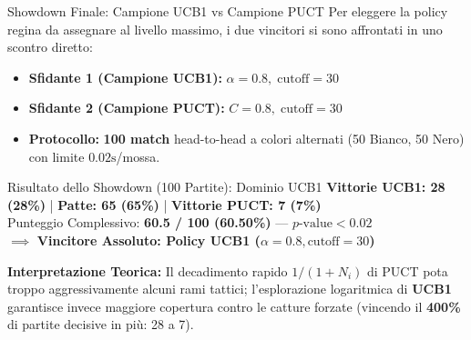 \documentclass[10pt]{beamer}
\begin{document}
\begin{frame}{Showdown Finale: Campione UCB1 vs Campione PUCT}
    Per eleggere la policy regina da assegnare al livello massimo, i due vincitori si sono affrontati in uno scontro diretto:
    
    \vspace{0.2cm}
    \begin{itemize}
        \item \textbf{Sfidante 1 (Campione UCB1):} $\alpha = 0.8, \; \text{cutoff} = 30$
        \item \textbf{Sfidante 2 (Campione PUCT):} $C = 0.8, \; \text{cutoff} = 30$
        \item \textbf{Protocollo:} \textbf{100 match} head-to-head a colori alternati (50 Bianco, 50 Nero) con limite $0.02\text{s}$/mossa.
    \end{itemize}

    \vspace{0.2cm}
    \begin{block}{Risultato dello Showdown (100 Partite): Dominio UCB1}
        \centering
        \textbf{Vittorie UCB1: 28 (28\%)} \quad | \quad \textbf{Patte: 65 (65\%)} \quad | \quad \textbf{Vittorie PUCT: 7 (7\%)} \\
        \vspace{0.1cm}
        Punteggio Complessivo: \textbf{60.5 / 100 (60.50\%)} --- $p\text{-value} < 0.02$ \\
        \vspace{0.05cm}
        $\implies$ \textbf{Vincitore Assoluto: Policy UCB1 ($\alpha = 0.8, \text{cutoff} = 30$)}
    \end{block}

    \vspace{0.15cm}
    \footnotesize
    \textbf{Interpretazione Teorica:} Il decadimento rapido $1/(1+N_i)$ di PUCT pota troppo aggressivamente alcuni rami tattici; l'esplorazione logaritmica di \textbf{UCB1} garantisce invece maggiore copertura contro le catture forzate (vincendo il \textbf{400\%} di partite decisive in più: 28 a 7).
\end{frame}
\end{document}
